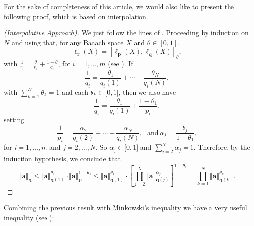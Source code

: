 \documentclass[10pt]{amsart}
\numberwithin{equation}{section}
\begin{document}
For the sake of completeness of this article, we would also like to present
the following proof, which is based on interpolation.

\begin{proof}[(Interpolative Approach)]
We just follow the lines of \cite[Proposition 2.1]{alb}. Proceeding by
induction on $N$ and using that, for any Banach space $X$ and $\theta \in
[0,1]$,
\begin{equation*}
\ell _{\mathbf{r}}(X)=\left[ \ell _{\mathbf{p}}(X),\ell _{\mathbf{q}}(X)\right] _{\theta },
\end{equation*}with $\frac{1}{r_{i}}=\frac{\theta }{p_{i}}+\frac{1-\theta }{q_{i}}$, for $i=1,\dots ,m$ (see \cite{berg.lofst}). If
\begin{equation*}
\frac{1}{q_{i}}=\frac{\theta _{1}}{q_{i}(1)}+\cdots +\frac{\theta _{N}}{q_{i}(N)},
\end{equation*}
with $\sum_{k=1}^{N}\theta _{k}=1$ and each $\theta _{k}\in \lbrack 0,1]$,
then we also have
\begin{equation*}
\frac{1}{q_{i}}=\frac{\theta _{1}}{q_{i}(1)}+\frac{1-\theta _{1}}{p_{i}},
\end{equation*}setting
\begin{equation*}
\frac{1}{p_{i}}=\frac{\alpha _{2}}{q_{i}(2)}+\cdots +\frac{\alpha _{N}}{q_{i}(N)},\ \ \ \mbox{and}\ \alpha _{j}=\frac{\theta _{j}}{1-\theta _{1}},
\end{equation*}for $i=1,\dots ,m$ and $j=2,\dots ,N$. So $\alpha _{j}\in \lbrack 0,1]$ and $\sum_{j=2}^{N}\alpha _{j}=1$. Therefore, by the induction hypothesis, we
conclude that
\begin{equation*}
\left\Vert \mathbf{a}\right\Vert _{\mathbf{q}}\leq \left\Vert \mathbf{a}\right\Vert _{\mathbf{q}(1)}^{\theta _{1}}\cdot \left\Vert \mathbf{a}\right\Vert _{\mathbf{p}}^{1-\theta _{1}}\leq \left\Vert \mathbf{a}\right\Vert _{\mathbf{q}(1)}^{\theta _{1}}\cdot \left[ \prod_{j=2}^{N}\left\Vert \mathbf{a}\right\Vert _{\mathbf{q}(j)}^{\alpha _{j}}\right] ^{1-\theta
_{1}}=\prod_{k=1}^{N}\left\Vert \mathbf{a}\right\Vert _{\mathbf{q}(k)}^{\theta _{k}}.
\end{equation*}
\end{proof}

Combining the previous result with Minkowski's inequality we have a very
useful inequality (see \cite[Remark 2.2]{bps}):
\end{document}
